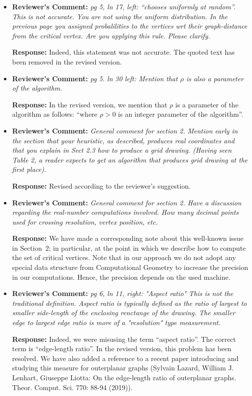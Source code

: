 \documentclass{article}
\newcommand{\rcomment}[1]{\vspace{0.3cm} \item \textbf{Reviewer's Comment:} {\em #1}}
\newcommand{\response}{\vspace{0.2cm} \textbf{Response: }}
\begin{document}
\begin{itemize}
\rcomment{pg 5, ln 17, left: ``chooses uniformly at random''. This is not accurate. You are not using the uniform distribution. In the previous page you assigned probalilities to the vertices wrt their graph-distance from the critical vertex. Are you applying this rule. Please clarify.}

\response{Indeed, this statement was not accurate. The quoted text has been removed in the revised version.}

\rcomment{pg 5. ln 30 left: Mention that $\rho$ is also a parameter of the algorithm.}

\response{In the revised version, we mention that $\rho$ is a parameter of the algorithm as follows: ``where $\rho > 0$ is an integer parameter of the algorithm''.}

\rcomment{General comment for section 2. Mention early in the section that your heuristic, as described, produces real coordinates and that you explain in Sect 2.3 how to produce a grid drawing. (Having seen Table 2, a reader expects to get an algorithm that produces grid drawing at the first place).}

\response{Revised according to the reviewer's suggestion.}

\rcomment{General comment for section 2. Have a discussion regarding the real-number computations involved. How many decimal points used for crossing resolution, vertex position, etc.}

\response{We have made a corresponding note about this well-known issue in Section~2; in particular, at the point in which we describe how to compute the set of critical vertices. Note that in our approach we do not adopt any special data structure from Computational Geometry to increase the precision in our computations. Hence, the precision depends on the used machine.}

\rcomment{pg 6, ln 11, right: "Aspect ratio" This is not the traditional definition. Aspect ratio is typically defined as the ratio of largest to smaller side-length of the enclosing renctange of the drawing. The smaller edge to largest edge ratio is more of a
"resolution" type measurement.} 

\response{Indeed, we were misusing the term ``aspect ratio''. The correct term is ``edge-length ratio''. In the revised version, this problem has been resolved. We have also added a reference to a recent paper introducing and studying this measure for outerplanar graphs (Sylvain Lazard, William J. Lenhart, Giuseppe Liotta: On the edge-length ratio of outerplanar graphs. Theor. Comput. Sci. 770: 88-94 (2019)).}


\end{itemize}
\end{document}
